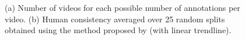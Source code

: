 \documentclass[sigconf]{acmart}
\begin{document}
\begin{figure}[!htbp]
	\centering
	\quad
	\quad
	\caption{\label{fig:human_consistency}(a) Number of videos for each possible number of annotations per video. (b) Human consistency averaged over 25 random splits obtained using the method proposed by \cite{isola_2014_makes} (with linear trendline).}
\end{figure}
\end{document}
